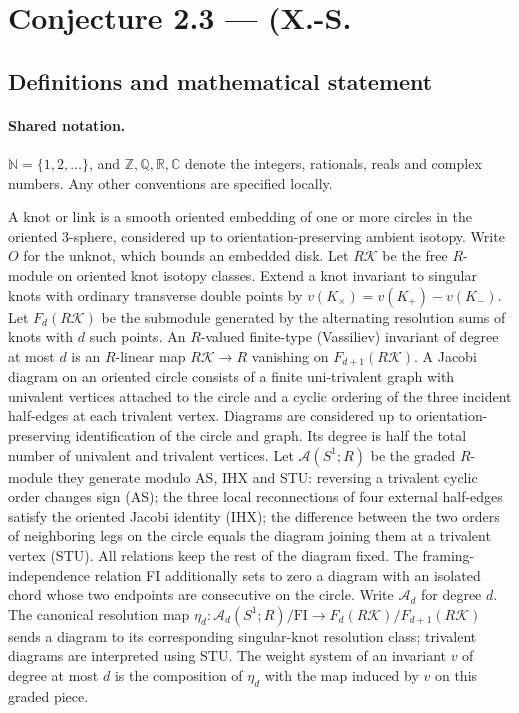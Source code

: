 \documentclass[11pt]{article}
\begin{document}
\section{Conjecture 2.3 — (X.-S.}\label{statement}

\subsection{Definitions and mathematical statement}

\paragraph{Shared notation.}$\mathbb N=\{1,2,\ldots\}$, and $\mathbb Z,\mathbb Q,\mathbb R,\mathbb C$ denote the integers, rationals, reals and complex numbers. Any other conventions are specified locally.


A knot or link is a smooth oriented embedding of one or more circles in the oriented $3$-sphere, considered up to orientation-preserving ambient isotopy. Write $O$ for the unknot, which bounds an embedded disk. Let $R\mathcal K$ be the free $R$-module on oriented knot isotopy classes. Extend a knot invariant to singular knots with ordinary transverse double points by $v(K_\times)=v(K_+)-v(K_-)$. Let $F_d(R\mathcal K)$ be the submodule generated by the alternating resolution sums of knots with $d$ such points. An $R$-valued finite-type (Vassiliev) invariant of degree at most $d$ is an $R$-linear map $R\mathcal K\to R$ vanishing on $F_{d+1}(R\mathcal K)$. A Jacobi diagram on an oriented circle consists of a finite uni-trivalent graph with univalent vertices attached to the circle and a cyclic ordering of the three incident half-edges at each trivalent vertex. Diagrams are considered up to orientation-preserving identification of the circle and graph. Its degree is half the total number of univalent and trivalent vertices. Let $\mathcal A(S^1;R)$ be the graded $R$-module they generate modulo AS, IHX and STU: reversing a trivalent cyclic order changes sign (AS); the three local reconnections of four external half-edges satisfy the oriented Jacobi identity (IHX); the difference between the two orders of neighboring legs on the circle equals the diagram joining them at a trivalent vertex (STU). All relations keep the rest of the diagram fixed. The framing-independence relation FI additionally sets to zero a diagram with an isolated chord whose two endpoints are consecutive on the circle. Write $\mathcal A_d$ for degree $d$. The canonical resolution map $\eta_d:\mathcal A_d(S^1;R)/\mathrm{FI}\to F_d(R\mathcal K)/F_{d+1}(R\mathcal K)$ sends a diagram to its corresponding singular-knot resolution class; trivalent diagrams are interpreted using STU. The weight system of an invariant $v$ of degree at most $d$ is the composition of $\eta_d$ with the map induced by $v$ on this graded piece.
\end{document}
